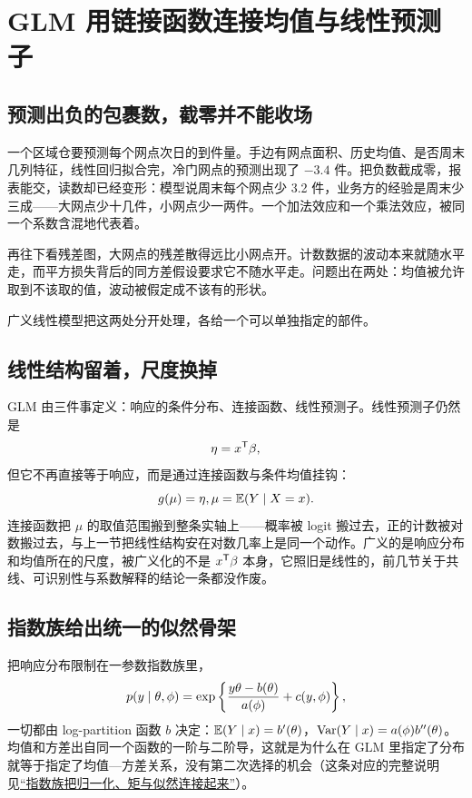 \section{GLM 用链接函数连接均值与线性预测子}
\label{sec:13-Machine-Learning/02-Linear-Models/05}

\subsection{预测出负的包裹数，截零并不能收场}

一个区域仓要预测每个网点次日的到件量。手边有网点面积、历史均值、是否周末几列特征，线性回归拟合完，冷门网点的预测出现了 \(-3.4\) 件。把负数截成零，报表能交，读数却已经变形：模型说周末每个网点少 3.2 件，业务方的经验是周末少三成——大网点少十几件，小网点少一两件。一个加法效应和一个乘法效应，被同一个系数含混地代表着。

再往下看残差图，大网点的残差散得远比小网点开。计数数据的波动本来就随水平走，而平方损失背后的同方差假设要求它不随水平走。问题出在两处：均值被允许取到不该取的值，波动被假定成不该有的形状。

广义线性模型把这两处分开处理，各给一个可以单独指定的部件。

\subsection{线性结构留着，尺度换掉}

GLM 由三件事定义：响应的条件分布、连接函数、线性预测子。线性预测子仍然是
\[
\eta=x^{\mathsf{T}}\beta,
\]
但它不再直接等于响应，而是通过连接函数与条件均值挂钩：
\[
g(\mu)=\eta,\space \mu=\mathbb{E}(Y\mid X=x).
\]
连接函数把 \(\mu\) 的取值范围搬到整条实轴上——概率被 logit 搬过去，正的计数被对数搬过去，与上一节把线性结构安在对数几率上是同一个动作。广义的是响应分布和均值所在的尺度，被广义化的不是 \(x^{\mathsf{T}}\beta\) 本身，它照旧是线性的，前几节关于共线、可识别性与系数解释的结论一条都没作废。

\subsection{指数族给出统一的似然骨架}

把响应分布限制在一参数指数族里，
\[
p(y\mid\theta,\phi)=\exp\left\{\frac{y\theta-b(\theta)}{a(\phi)}+c(y,\phi)\right\},
\]
一切都由 log-partition 函数 \(b\) 决定：\(\mathbb{E}(Y\mid x)=b'(\theta)\)，\(\operatorname{Var}(Y\mid x)=a(\phi)b''(\theta)\)。均值和方差出自同一个函数的一阶与二阶导，这就是为什么在 GLM 里指定了分布就等于指定了均值—方差关系，没有第二次选择的机会（这条对应的完整说明见\hyperref[sec:13-Machine-Learning/06-Probabilistic-Models/06]{``指数族把归一化、矩与似然连接起来''}）。

